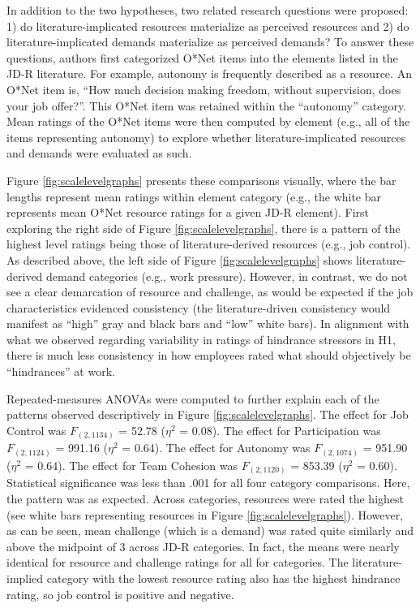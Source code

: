 \documentclass[
  jou,mask]{apa6}
\begin{document}
In addition to the two hypotheses, two related research questions were proposed: 1) do literature-implicated resources materialize as perceived resources and 2) do literature-implicated demands materialize as perceived demands? To answer these questions, authors first categorized O*Net items into the elements listed in the JD-R literature. For example, autonomy is frequently described as a resource. An O*Net item is, ``How much decision making freedom, without supervision, does your job offer?''. This O*Net item was retained within the ``autonomy'' category. Mean ratings of the O*Net items were then computed by element (e.g., all of the items representing autonomy) to explore whether literature-implicated resources and demands were evaluated as such.

Figure \ref{fig:scalelevelgraphs} presents these comparisons visually, where the bar lengths represent mean ratings within element category (e.g., the white bar represents mean O*Net resource ratings for a given JD-R element). First exploring the right side of Figure \ref{fig:scalelevelgraphs}, there is a pattern of the highest level ratings being those of literature-derived resources (e.g., job control). As described above, the left side of Figure \ref{fig:scalelevelgraphs} shows literature-derived demand categories (e.g., work pressure). However, in contrast, we do not see a clear demarcation of resource and challenge, as would be expected if the job characteristics evidenced consistency (the literature-driven consistency would manifest as ``high'' gray and black bars and ``low'' white bars). In alignment with what we observed regarding variability in ratings of hindrance stressors in H1, there is much less consistency in how employees rated what should objectively be ``hindrances'' at work.

Repeated-measures ANOVAs were computed to further explain each of the patterns observed descriptively in Figure \ref{fig:scalelevelgraphs}. The effect for Job Control was \(F_{(2, 1134)}\) = 52.78 (\(\eta^2\) = 0.08).
The effect for Participation was \(F_{(2, 1124)}\) = 991.16 (\(\eta^2\) = 0.64).
The effect for Autonomy was \(F_{(2, 1074)}\) = 951.90 (\(\eta^2\) = 0.64).
The effect for Team Cohesion was \(F_{(2, 1120)}\) = 853.39 (\(\eta^2\) = 0.60). Statistical significance was less than .001 for all four category comparisons. Here, the pattern was as expected. Across categories, resources were rated the highest (see white bars representing resources in Figure \ref{fig:scalelevelgraphs}). However, as can be seen, mean challenge (which is a demand) was rated quite similarly and above the midpoint of 3 across JD-R categories. In fact, the means were nearly identical for resource and challenge ratings for all for categories. The literature-implied category with the lowest resource rating also has the highest hindrance rating, so job control is positive and negative.
\end{document}
